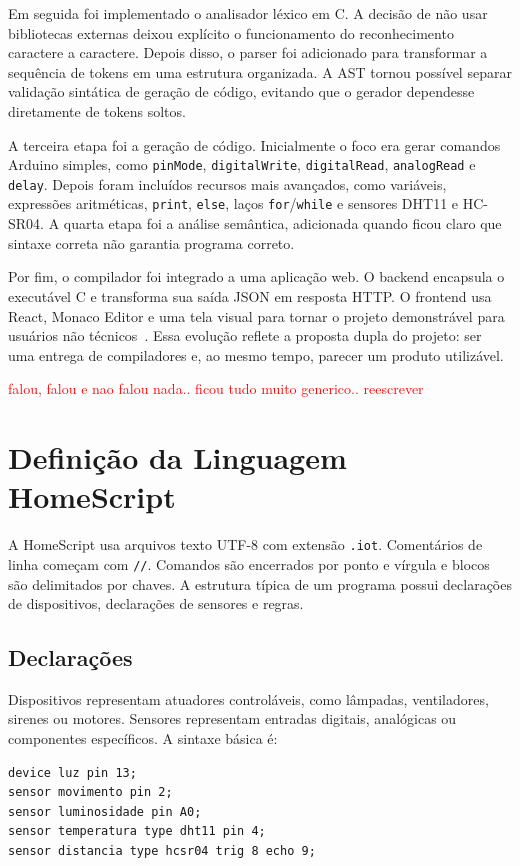 \documentclass[conference]{IEEEtran}
\begin{document}
Em seguida foi implementado o analisador léxico em C. A decisão de não usar bibliotecas externas deixou explícito o funcionamento do reconhecimento caractere a caractere. Depois disso, o parser foi adicionado para transformar a sequência de tokens em uma estrutura organizada. A AST tornou possível separar validação sintática de geração de código, evitando que o gerador dependesse diretamente de tokens soltos.

A terceira etapa foi a geração de código. Inicialmente o foco era gerar comandos Arduino simples, como \texttt{pinMode}, \texttt{digitalWrite}, \texttt{digitalRead}, \texttt{analogRead} e \texttt{delay}. Depois foram incluídos recursos mais avançados, como variáveis, expressões aritméticas, \texttt{print}, \texttt{else}, laços \texttt{for}/\texttt{while} e sensores DHT11 e HC-SR04. A quarta etapa foi a análise semântica, adicionada quando ficou claro que sintaxe correta não garantia programa correto.

Por fim, o compilador foi integrado a uma aplicação web. O backend encapsula o executável C e transforma sua saída JSON em resposta HTTP. O frontend usa React, Monaco Editor e uma tela visual para tornar o projeto demonstrável para usuários não técnicos~\cite{fastapi,react,monaco}. Essa evolução reflete a proposta dupla do projeto: ser uma entrega de compiladores e, ao mesmo tempo, parecer um produto utilizável.

\textcolor{red}{falou, falou e nao falou nada.. ficou tudo muito generico.. reescrever}

\section{Definição da Linguagem HomeScript}
A HomeScript usa arquivos texto UTF-8 com extensão \texttt{.iot}. Comentários de linha começam com \texttt{//}. Comandos são encerrados por ponto e vírgula e blocos são delimitados por chaves. A estrutura típica de um programa possui declarações de dispositivos, declarações de sensores e regras.

\subsection{Declarações}
Dispositivos representam atuadores controláveis, como lâmpadas, ventiladores, sirenes ou motores. Sensores representam entradas digitais, analógicas ou componentes específicos. A sintaxe básica é:

\begin{lstlisting}[style=homescript]
device luz pin 13;
sensor movimento pin 2;
sensor luminosidade pin A0;
sensor temperatura type dht11 pin 4;
sensor distancia type hcsr04 trig 8 echo 9;
\end{lstlisting}
\end{document}
